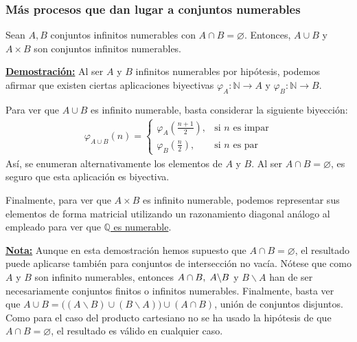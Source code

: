 \documentclass[12pt,a4paper]{article}
\newcommand{\N}{\mathbb{N}}
\newcommand{\Q}{\mathbb{Q}}
\newcounter{unit}[section]
\newcounter{chapter}[unit]
\renewcommand{\theunit}{\arabic{unit}}
\renewcommand{\thechapter}{\arabic{chapter}}
\renewcommand{\thesubsubsection}{\theunit.\thechapter.\arabic{subsubsection}}
\newcommand{\result}[1]{%
  \subsubsection{#1}%
  \label{result:\thesubsubsection}
}
\newcommand{\dem}{
    \noindent \underline{\textbf{Demostración:}}
}
\newcommand{\nota}{
    \noindent \underline{\textbf{Nota:}}
}
\begin{document}
\result{Más procesos que dan lugar a conjuntos numerables}
\hspace{3mm}
Sean $A, B$ conjuntos infinitos numerables con $A \cap B = \varnothing$.
Entonces, $A \cup B$ y $A \times B$ son conjuntos infinitos numerables.

\vspace{4mm}
\dem Al ser $A$ y $B$ infinitos numerables por hipótesis, podemos afirmar que existen ciertas
aplicaciones biyectivas \hspace{1mm} $\varphi_A : \N \to A$ \hspace{1mm} y \hspace{1mm} $\varphi_B : \N \to B$.

\vspace{2mm} \noindent
Para ver que $A \cup B$ es infinito numerable, basta considerar la siguiente biyección:
\\[-4ex]
\begin{align*}
    \varphi_{A \cup B} (n) =
    \begin{cases}
        \varphi_A\left(\frac{n+1}{2}\right), & \text{si } n \text{ es impar} \\
        \varphi_B\left(\frac{n}{2}\right), & \text{si } n \text{ es par}
    \end{cases}
\end{align*}
Así, se enumeran alternativamente los elementos de $A$ y $B$. Al ser $A \cap B = \varnothing$,
es seguro que esta aplicación es biyectiva.

\vspace{4mm}
Finalmente, para ver que $A \times B$ es infinito numerable, podemos representar sus elementos de forma matricial
utilizando un razonamiento diagonal análogo al empleado para ver que \hyperref[racionales-numerables]{$\Q$ es numerable}.

\vspace{6mm}
\nota Aunque en esta demostración hemos supuesto que $A \cap B = \varnothing$, el resultado puede aplicarse también para conjuntos
de intersección no vacía. Nótese que como $A$ y $B$ son infinito numerables, entonces $A \cap B, \hspace{1mm} A \backslash B$ y $B \backslash A$
han de ser necesariamente conjuntos finitos o infinitos numerables. Finalmente, basta ver que
$A \cup B =\big((A\backslash B) \cup (B \backslash A) \big) \cup (A \cap B)$, unión de conjuntos disjuntos.
Como para el caso del producto cartesiano no se ha usado la hipótesis
de que $A \cap B = \varnothing$, el resultado es válido en cualquier caso.
\end{document}

